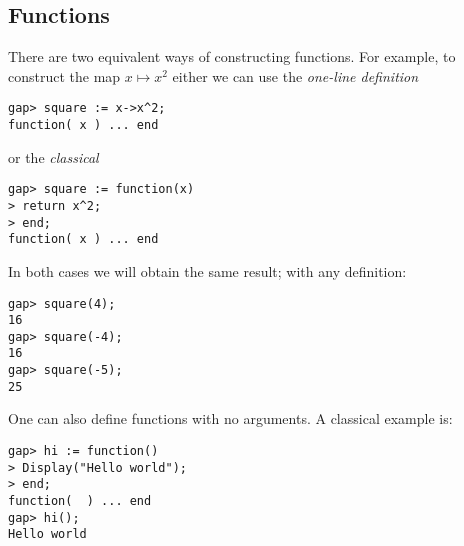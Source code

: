 
\subsection*{Functions}

There are two equivalent ways of constructing functions. For example, to
construct the map $x\mapsto x^2$ either we can use the {\it one-line definition}
\begin{lstlisting}
gap> square := x->x^2;
function( x ) ... end
\end{lstlisting}
or the {\it classical}
\begin{lstlisting}
gap> square := function(x)
> return x^2;
> end;
function( x ) ... end
\end{lstlisting}
In both cases we will obtain the same result; with any definition:
\begin{lstlisting}
gap> square(4);
16
gap> square(-4);
16
gap> square(-5);
25
\end{lstlisting}
One can also define functions with no arguments. A classical example is:
\begin{lstlisting}
gap> hi := function()
> Display("Hello world");
> end;
function(  ) ... end
gap> hi();
Hello world
\end{lstlisting}

